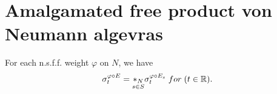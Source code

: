 \section{Amalgamated free product von Neumann algevras}
\cite{ueda1999amalgamated}
\begin{theorem}
  For each n.s.f.f. weight $\varphi$ on $N$, we have
  \begin{align*}
    \sigma_t^{\varphi \circ E} = \underset{s \in S}{*_N} \sigma_t^{\varphi \circ E_s} \; for \; (t \in \mathbb{R}).
  \end{align*}
\end{theorem}

